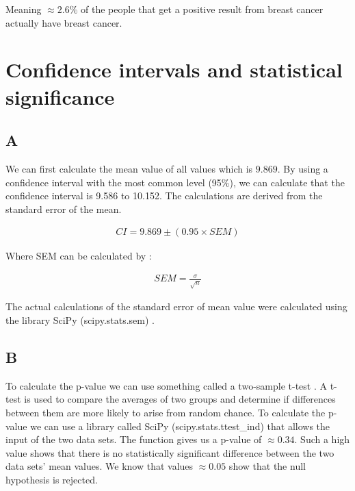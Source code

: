 \documentclass{article}
\begin{document}
\noindent Meaning $\approx 2.6\%$ of the people that get a positive result from breast cancer actually have breast cancer.

\section{Confidence intervals and statistical significance}
\subsection{A}
We can first calculate the mean value of all values which is $9.869$. By using a confidence interval \cite{simundic2008confidence} with the most common level (95\%), we can calculate that the confidence interval is 9.586 to 10.152. The calculations are derived from the standard error of the mean.

\begin{align*}
CI= 9.869 \pm (0.95 \times SEM)
\end{align*}

\noindent Where SEM can be calculated by \cite{Standard4:online}:

\begin{align*}
SEM=\frac{\sigma}{\sqrt{n}}
\end{align*}

\noindent The actual calculations of the standard error of mean value were calculated using the library SciPy (scipy.stats.sem) \cite{scipysta19:online}.

\subsection{B}
To calculate the p-value we can use something called a two-sample t-test \cite{TwoSampl7:online}. A t-test is used to compare the averages of two groups and determine if differences between them are more likely to arise from random chance. To calculate the p-value we can use a library called SciPy (scipy.stats.ttest\_ind) \cite{scipysta44:online} that allows the input of the two data sets. The function gives us a p-value of $\approx 0.34$. Such a high value shows that there is no statistically significant difference between the two data sets' mean values. We know that values $\approx 0.05$ show that the null hypothesis is rejected.

\hspace{0cm}
\newpage



\end{document}
